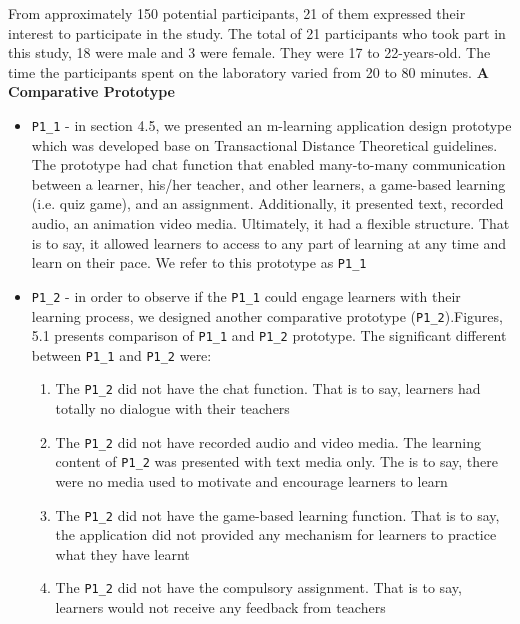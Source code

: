 From approximately 150 potential participants, 21 of them expressed their interest to participate in the study. The total of 21 participants who took part in this study, 18 were male and 3 were female. They were 17 to 22-years-old. The time the participants spent on the laboratory varied from 20 to 80 minutes. 
\newline
\newline
\textbf{A Comparative Prototype} 
\begin{itemize} 
\item \verb|P1_1| - in section 4.5, we presented an m-learning application design prototype which was developed base on Transactional Distance Theoretical guidelines. The prototype had chat function that enabled many-to-many communication between a learner, his/her teacher, and other learners, a game-based learning (i.e. quiz game), and an assignment. Additionally, it presented text, recorded audio, an animation video media. Ultimately, it had a flexible structure. That is to say, it allowed learners to access to any part of learning at any time and learn on their pace. We refer to this prototype as \verb|P1_1| 

\item \verb|P1_2| - in order to observe if the \verb|P1_1| could engage learners with their learning process, we designed another comparative prototype (\verb|P1_2|).Figures, 5.1 presents comparison of \verb|P1_1| and \verb|P1_2| prototype. The significant different between \verb|P1_1| and \verb|P1_2| were: 

\begin{enumerate} 
\item The \verb|P1_2| did not have the chat function. That is to say, learners had totally no dialogue with their teachers 
\item The \verb|P1_2| did not have recorded audio and video media. The learning content of \verb|P1_2| was presented with text media only. The is to say, there were no media used to motivate and encourage learners to learn
\item The \verb|P1_2| did not have the game-based learning function. That is to say, the application did not provided any mechanism for learners to practice what they have learnt
\item The \verb|P1_2| did not have the compulsory assignment. That is to say, learners would not receive any feedback from teachers 
\end{enumerate} 
\end{itemize}

